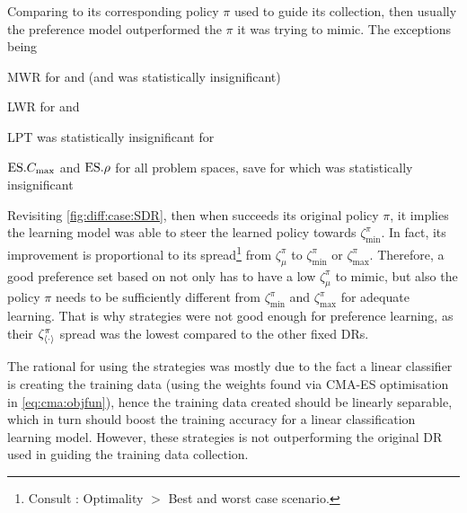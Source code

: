 
\pagebreak
Comparing \PsiSet{\pi} to its corresponding policy $\pi$ used to guide its 
collection, then usually the preference model outperformed the $\pi$ it 
was trying to mimic. The exceptions being 
\begin{enumerate*}
  \item MWR for  and  (and  was 
  statistically insignificant)
  \item LWR for  and 
  \item LPT was statistically insignificant for 
  \item $\text{ES}.{C_{\max}}$ and $\text{ES}.{\rho}$ for all problem spaces, save for  
  which was statistically insignificant
\end{enumerate*}
Revisiting \cref{fig:diff:case:SDR}, then when \PsiSet[\pi]{} 
succeeds its original policy $\pi$, it implies the learning model was able to 
steer the learned policy towards $\zeta_{\min}^{\pi}$. 
In fact, its improvement is proportional to its spread\footnote{Consult \shiny:
    Optimality $>$ Best and worst case scenario.}  
from $\zeta_{\mu}^{\pi}$ to $\zeta_{\min}^{\pi}$ or $\zeta_{\max}^{\pi}$.
Therefore, a good preference set based on \PhiSet{\pi} not only has to have a 
low $\zeta_{\mu}^\pi$ to mimic, but also the policy $\pi$ needs to be 
sufficiently different from $\zeta_{\min}^{\pi}$ and $\zeta_{\max}^{\pi}$ for 
adequate learning. That is why \PhiSet{\CMAES} strategies 
were not good enough for preference learning, as their 
$\zeta^\pi_{\langle \cdot \rangle}$ spread was the lowest compared to the other fixed DRs.

The rational for using the \PhiSet{\CMAES} strategies
was mostly due to the fact a linear classifier is creating the training data 
(using the weights found via CMA-ES optimisation in \cref{eq:cma:objfun}), 
hence the training data created should be linearly separable, which in turn 
should boost the training accuracy for a linear classification learning model. 
However, these strategies is not outperforming the original DR used in guiding 
the training data collection. 

